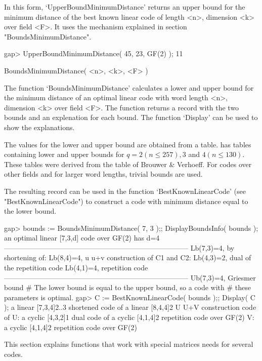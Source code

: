 In this form, `UpperBoundMinimumDistance' returns  an upper bound for the
minimum distance of the  best known linear  code of length <n>, dimension
<k>  over  field   <F>.  It  uses the    mechanism explained  in  section
"BoundsMinimumDistance".

\beginexample
gap> UpperBoundMinimumDistance( 45, 23, GF(2) );
11 
\endexample

\>BoundsMinimumDistance( <n>, <k>, <F> )

The function  `BoundsMinimumDistance' calculates a  lower and upper bound
for the minimum distance of an optimal  linear code with word length <n>,
dimension <k> over field <F>. The function  returns a record with the two
bounds and an explenation for  each bound. The  function `Display' can be
used to show the explanations.

The  values   for the  lower   and  upper   bound  are  obtained from   a
table. {\GUAVA} has tables containing lower and upper bounds for $q=2 (n
\leq 257), 3$ and $4 (n \leq 130)$.  These tables were derived from the
table of Brouwer \& Verhoeff. For codes over  other fields and for larger
word lengths, trivial bounds are used.

The  resulting record can  be  used in the function `BestKnownLinearCode'
(see "BestKnownLinearCode") to   construct a code  with minimum  distance
equal to the lower bound.

\beginexample
gap> bounds := BoundsMinimumDistance( 7, 3 );; DisplayBoundsInfo( bounds );
an optimal linear [7,3,d] code over GF(2) has d=4
------------------------------------------------------------------------------
Lb(7,3)=4, by shortening of:
Lb(8,4)=4, u u+v construction of C1 and C2:
Lb(4,3)=2, dual of the repetition code
Lb(4,1)=4, repetition code
------------------------------------------------------------------------------
Ub(7,3)=4, Griesmer bound
# The lower bound is equal to the upper bound, so a code with
# these parameters is optimal.
gap> C := BestKnownLinearCode( bounds );; Display( C );
a linear [7,3,4]2..3 shortened code of
a linear [8,4,4]2 U U+V construction code of
U: a cyclic [4,3,2]1 dual code of
   a cyclic [4,1,4]2 repetition code over GF(2)
V: a cyclic [4,1,4]2 repetition code over GF(2)
\endexample


This section explains functions  that work with special matrices {\GUAVA}
needs for several codes.

